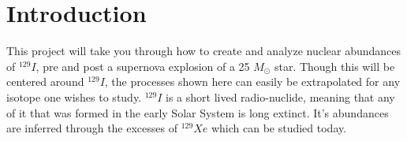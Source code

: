 \section*{Introduction}
This project will take you through how to create and analyze nuclear abundances
of $^{129}I$, pre and post a supernova explosion of a 25 $M_{\odot}$ star. 
Though this will be centered around $^{129}I$, the processes shown here can easily be extrapolated for any isotope one wishes to study.
$^{129}I$ is a short lived radio-nuclide, meaning that any of it that was formed
in the early Solar System is long extinct. It's abundances are inferred
through the excesses of $^{129}Xe$ which can be studied today.

